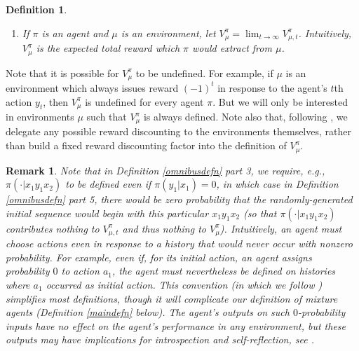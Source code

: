 \documentclass[twoside]{article}
\newtheorem{definition}[theorem]{Definition}
\newtheorem{remark}[theorem]{Remark}
\begin{document}
\begin{definition}
\begin{enumerate}
        $x_0y_0\ldots x_{t}y_{t}$
        randomly generated as follows:
        \begin{enumerate}
            \item
            Each $x_i\in\mathcal E$ is chosen randomly based on
            the probability distribution
            $\mu(\cdot|x_1y_1\ldots x_{i-1}y_{i-1})$
            (or $\mu(\cdot|\epsilon)$ if $i=0$).
            \item
            Each
            $y_i\in\mathcal A$ is chosen randomly based on the probability distribution
            $\pi(\cdot|x_1y_1\ldots x_{i-1}y_{i-1}x_i)$
            (or $\pi(\cdot|\epsilon)$ if $i=0$).
        \end{enumerate}
        Intuitively, if each $x_i=(o_i,r_i)$, then
        $V^\pi_{\mu,t}$ can be thought of as the expected total reward
        $\mathbb E(\sum_{i=0}^t r_i)$.
        \item
        If $\pi$ is an agent and $\mu$ is an environment,
        let $V^\pi_\mu=\lim_{t\to\infty}V^{\pi}_{\mu,t}$.
        Intuitively, $V^\pi_\mu$ is the expected total reward which $\pi$ would extract
        from $\mu$.
    \end{enumerate}
\end{definition}

Note that it is possible for $V^\pi_\mu$ to be undefined.
For example, if $\mu$ is an environment which always issues
reward $(-1)^t$ in response to the agent's $t$th action $y_t$,
then $V^\pi_\mu$ is undefined for every agent $\pi$.
But we will only be interested in environments $\mu$ such that $V^\pi_\mu$
is always defined. Note also that, following \cite{legg2007universal},
we delegate any possible reward discounting to the environments themselves,
rather than build a fixed reward discounting factor into the definition
of $V^\pi_\mu$.

\begin{remark}
\label{impossibleremark}
    Note that in Definition \ref{omnibusdefn} part 3, we require,
    e.g., $\pi(\cdot|x_1y_1x_2)$ to be defined even if
    $\pi(y_1|x_1)=0$, in which case in Definition \ref{omnibusdefn} part 5,
    there would be zero probability that the randomly-generated initial
    sequence would begin with this particular $x_1y_1x_2$
    (so that $\pi(\cdot|x_1y_1x_2)$ contributes nothing to
    $V^\pi_{\mu,t}$ and thus nothing to $V^\pi_\mu$).
    Intuitively, an agent must choose actions even in response to
    a history that would never occur with nonzero probability.
    For example, even if, for its initial action, an agent assigns
    probability $0$ to action $a_1$, the agent must nevertheless
    be defined on histories where $a_1$ occurred as initial action.
    This convention (in which we follow \cite{legg2007universal}) simplifies most
    definitions, though it will complicate our definition of mixture agents
    (Definition \ref{maindefn} below). The agent's outputs on such
    $0$-probability inputs have no effect on the agent's performance
    in any environment, but these outputs may have implications for introspection
    and self-reflection, see \cite{extendedenvironmentspaper}.
\end{remark}
\end{document}
